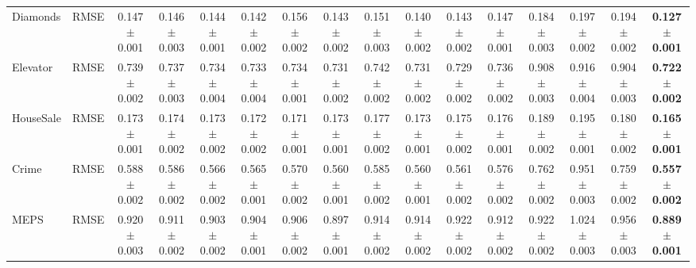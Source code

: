 \documentclass[conference]{IEEEtran}
\newcommand{\syic}[1]{{\color{black}#1}}
\begin{document}
\begin{table}
{\begin{tabular}{l l c c c c c c c c c c c c c c}
      \midrule
      Diamonds
        & RMSE
        & \syic{0.147$\pm$0.001}
        & \syic{0.146$\pm$0.003}
        & \syic{0.144$\pm$0.001}
        & \syic{0.142$\pm$0.002}
        & \syic{0.156$\pm$0.002}
        & \syic{0.143$\pm$0.002}
        & \syic{0.151$\pm$0.003}
        & \syic{0.140$\pm$0.002}
        & \syic{0.143$\pm$0.002}
        & \syic{0.147$\pm$0.001}
        & \syic{0.184$\pm$0.003}
        & \syic{0.197$\pm$0.002}
        & \syic{0.194$\pm$0.002}
        & \syic{\textbf{0.127$\pm$0.001}} \\
      Elevator
        & RMSE
        & \syic{0.739$\pm$0.002}
        & \syic{0.737$\pm$0.003}
        & \syic{0.734$\pm$0.004}
        & \syic{0.733$\pm$0.004}
        & \syic{0.734$\pm$0.001}
        & \syic{0.731$\pm$0.002}
        & \syic{0.742$\pm$0.002}
        & \syic{0.731$\pm$0.002}
        & \syic{0.729$\pm$0.002}
        & \syic{0.736$\pm$0.002}
        & \syic{0.908$\pm$0.003}
        & \syic{0.916$\pm$0.004}
        & \syic{0.904$\pm$0.003}
        & \syic{\textbf{0.722$\pm$0.002}} \\
      HouseSale
        & RMSE
        & \syic{0.173$\pm$0.001}
        & \syic{0.174$\pm$0.002}
        & \syic{0.173$\pm$0.002}
        & \syic{0.172$\pm$0.002}
        & \syic{0.171$\pm$0.001}
        & \syic{0.173$\pm$0.001}
        & \syic{0.177$\pm$0.002}
        & \syic{0.173$\pm$0.001}
        & \syic{0.175$\pm$0.002}
        & \syic{0.176$\pm$0.001}
        & \syic{0.189$\pm$0.002}
        & \syic{0.195$\pm$0.001}
        & \syic{0.180$\pm$0.002}
        & \syic{\textbf{0.165$\pm$0.001}} \\
      Crime
        & RMSE
        & \syic{0.588$\pm$0.002}
        & \syic{0.586$\pm$0.002}
        & \syic{0.566$\pm$0.002}
        & \syic{0.565$\pm$0.001}
        & \syic{0.570$\pm$0.002}
        & \syic{0.560$\pm$0.001}
        & \syic{0.585$\pm$0.002}
        & \syic{0.560$\pm$0.001}
        & \syic{0.561$\pm$0.002}
        & \syic{0.576$\pm$0.002}
        & \syic{0.762$\pm$0.002}
        & \syic{0.951$\pm$0.003}
        & \syic{0.759$\pm$0.002}
        & \syic{\textbf{0.557$\pm$0.002}} \\
      MEPS
        & RMSE
        & \syic{0.920$\pm$0.003}
        & \syic{0.911$\pm$0.002}
        & \syic{0.903$\pm$0.002}
        & \syic{0.904$\pm$0.001}
        & \syic{0.906$\pm$0.002}
        & \syic{0.897$\pm$0.001}
        & \syic{0.914$\pm$0.002}
        & \syic{0.914$\pm$0.002}
        & \syic{0.922$\pm$0.002}
        & \syic{0.912$\pm$0.002}
        & \syic{0.922$\pm$0.002}
        & \syic{1.024$\pm$0.003}
        & \syic{0.956$\pm$0.003}
        & \syic{\textbf{0.889$\pm$0.001}} \\
      \bottomrule
    \end{tabular}
    }
\end{table}
\end{document}
